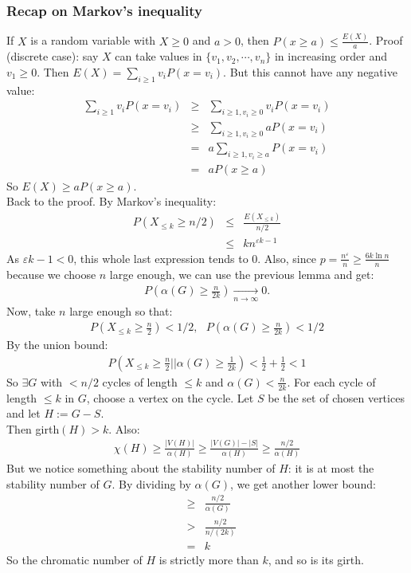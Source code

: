 \subsubsection{Recap on Markov's inequality}
If $X$ is a random variable with $X \geq 0$ and $a > 0$, then $P(x \geq a) \leq \frac{E(X)}{a}$. Proof (discrete case): say $X$ can take values in $\{v_1, v_2, \dotsb, v_n\}$ in increasing order and $v_1 \geq 0$. Then $E(X) = \sum_{i \geq 1} v_i P(x = v_i)$. But this cannot have any negative value: 
\begin{eqnarray}
	\sum_{i \geq 1} v_i P(x = v_i) &\geq& \sum_{i \geq 1, v_i \geq 0} v_i P(x = v_i) \\
	&\geq&\sum_{i \geq 1, v_i \geq 0}  aP(x = v_i) \\
	&=& a \sum_{i \geq 1, v_i \geq a} P(x = v_i)\\
	&=& a P(x \geq a) 
\end{eqnarray} 	
So $E(X) \geq a P(x \geq a)$.\\
		
		
Back to the proof. By Markov's inequality:
\begin{eqnarray}
	P(X_{\leq k} \geq n/2) &\leq& \frac{E(X_{\leq k})}{n/2} \\
	&\leq& k n^{\varepsilon k-1}
\end{eqnarray}
As $\varepsilon k-1 <0$, this whole last expression tends to 0. Also, since $p = \frac{n^\varepsilon}{n} \geq \frac{6k \ln n}{n}$ because we choose $n$ large enough, we can use the previous lemma and get:
\begin{eqnarray}
	P(\alpha(G) \geq \frac{n}{2k}) \underset{n \rightarrow \infty}{\rightarrow} 0.
\end{eqnarray}
Now, take $n$ large enough so that:
\begin{eqnarray}
	P(X_{\leq k} \geq \frac{n}{2}) < 1/2, ~~~
	P(\alpha(G) \geq \frac{n}{2k}) < 1/2
\end{eqnarray}
By the union bound:
\begin{eqnarray}
	P(X_{\leq k} \geq \frac{n}{2} || \alpha(G) \geq \frac{1}{2k}) < \frac{1}{2} + \frac{1}{2} < 1
\end{eqnarray}
So $\exists G$ with $<n/2$ cycles of length $\leq k$ and $\alpha(G) < \frac{n}{2k}$. For each cycle of length $\leq k$ in $G$, choose a vertex on the cycle. Let $S$ be the set of chosen vertices and let $H := G - S$.\\

Then girth$(H) > k$. Also:
\begin{eqnarray}
	\chi(H) \geq \frac{|V(H)|}{\alpha(H)} \geq \frac{|V(G)| - |S|}{\alpha(H)} \geq \frac{n/2}{\alpha(H)}
\end{eqnarray} 
But we notice something about the stability number of $H$: it is at most the stability number of $G$. By dividing by $\alpha(G)$, we get another lower bound:
\begin{eqnarray}
	&\geq& \frac{n/2}{\alpha(G)}\\
	&>& \frac{n/2}{n/(2k)} \\
	&=& k
\end{eqnarray}
So the chromatic number of $H$ is strictly more than $k$, and so is its girth.

